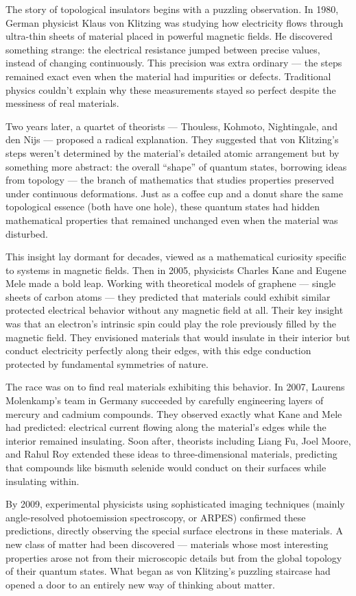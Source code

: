 \begin{historical}
The story of topological insulators begins with a puzzling observation. In 1980, German physicist Klaus von Klitzing was studying how electricity flows through ultra-thin sheets of material placed in powerful magnetic fields. He discovered something strange: the electrical resistance jumped between precise values, instead of changing continuously. This precision was extra ordinary — the steps remained exact even when the material had impurities or defects. Traditional physics couldn't explain why these measurements stayed so perfect despite the messiness of real materials.

Two years later, a quartet of theorists — Thouless, Kohmoto, Nightingale, and den Nijs — proposed a radical explanation. They suggested that von Klitzing's steps weren't determined by the material's detailed atomic arrangement but by something more abstract: the overall ``shape'' of quantum states, borrowing ideas from topology — the branch of mathematics that studies properties preserved under continuous deformations. Just as a coffee cup and a donut share the same topological essence (both have one hole), these quantum states had hidden mathematical properties that remained unchanged even when the material was disturbed.

This insight lay dormant for decades, viewed as a mathematical curiosity specific to systems in magnetic fields. Then in 2005, physicists Charles Kane and Eugene Mele made a bold leap. Working with theoretical models of graphene — single sheets of carbon atoms — they predicted that materials could exhibit similar protected electrical behavior without any magnetic field at all. Their key insight was that an electron's intrinsic spin could play the role previously filled by the magnetic field. They envisioned materials that would insulate in their interior but conduct electricity perfectly along their edges, with this edge conduction protected by fundamental symmetries of nature.

The race was on to find real materials exhibiting this behavior. In 2007, Laurens Molenkamp's team in Germany succeeded by carefully engineering layers of mercury and cadmium compounds. They observed exactly what Kane and Mele had predicted: electrical current flowing along the material's edges while the interior remained insulating. Soon after, theorists including Liang Fu, Joel Moore, and Rahul Roy extended these ideas to three-dimensional materials, predicting that compounds like bismuth selenide would conduct on their surfaces while insulating within.

By 2009, experimental physicists using sophisticated imaging techniques (mainly angle-resolved photoemission spectroscopy, or ARPES) confirmed these predictions, directly observing the special surface electrons in these materials. A new class of matter had been discovered — materials whose most interesting properties arose not from their microscopic details but from the global topology of their quantum states. What began as von Klitzing's puzzling staircase had opened a door to an entirely new way of thinking about matter.
\end{historical}
